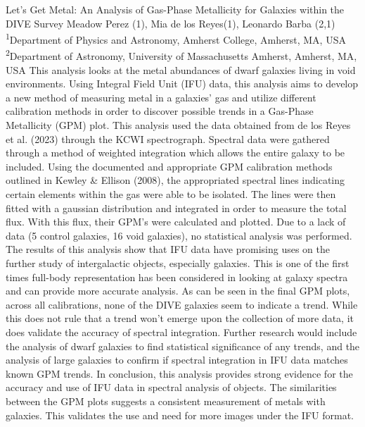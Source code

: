 \makeabstract
{
Let’s Get Metal: An Analysis of Gas-Phase Metallicity for Galaxies within the DIVE Survey
}
{
Meadow Perez (1), Mia de los Reyes(1), Leonardo Barba (2,1)
}
{
\textsuperscript{1}Department of Physics and Astronomy, Amherst College, Amherst, MA, USA\\
\textsuperscript{2}Department of Astronomy, University of Massachusetts Amherst, Amherst, MA, USA
}
{
This analysis looks at the metal abundances of dwarf galaxies living in void environments. Using Integral Field Unit (IFU) data, this analysis aims to develop a new method of measuring metal in a galaxies’ gas and utilize different calibration methods in order to discover possible trends in a Gas-Phase Metallicity (GPM) plot.
}
{
This analysis used the data obtained from de los Reyes et al. (2023) through the KCWI spectrograph. Spectral data were gathered through a method of weighted integration which allows the entire galaxy to be included. Using the documented and appropriate GPM calibration methods outlined in Kewley \& Ellison (2008), the appropriated spectral lines indicating certain elements within the gas were able to be isolated. The lines were then fitted with a gaussian distribution and integrated in order to measure the total flux. With this flux, their GPM’s were calculated and plotted. Due to a lack of data (5 control galaxies, 16 void galaxies), no statistical analysis was performed.
}
{
The results of this analysis show that IFU data have promising uses on the further study of intergalactic objects, especially galaxies. This is one of the first times full-body representation has been considered in looking at galaxy spectra and can provide more accurate analysis. As can be seen in the final GPM plots, across all calibrations, none of the DIVE galaxies seem to indicate a trend. While this does not rule that a trend won’t emerge upon the collection of more data, it does validate the accuracy of spectral integration. Further research would include the analysis of dwarf galaxies to find statistical significance of any trends, and the analysis of large galaxies to confirm if spectral integration in IFU data matches known GPM trends.
}
{
In conclusion, this analysis provides strong evidence for the accuracy and use of IFU data in spectral analysis of objects. The similarities between the GPM plots suggests a consistent measurement of metals with galaxies. This validates the use and need for more images under the IFU format.
}

\newpage
